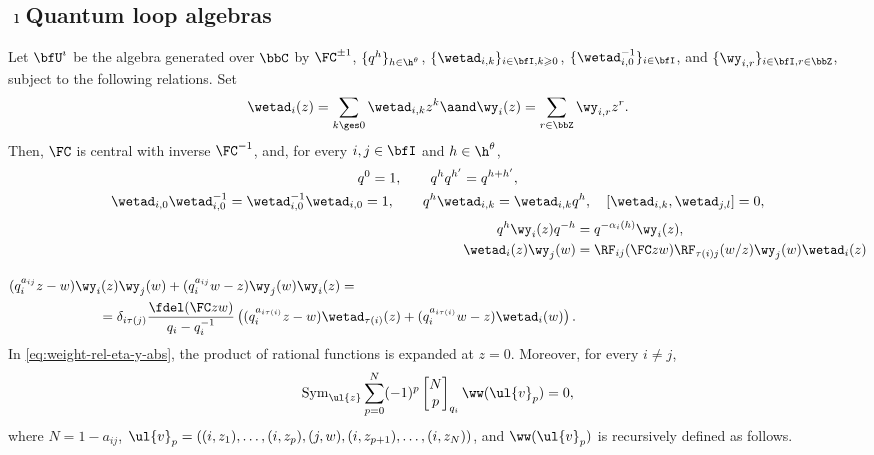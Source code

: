 \documentclass[reqno]{amsart}
\numberwithin{equation}{section}
\begin{document}
\subsection{$\imath$Quantum loop algebras \cite{lu-wang-20, zhang-22,lu-pan-26}}\label{ss:i-quantum-group}
Let $\bfU^\imath$ be the algebra generated over $\bbC$ by $\FC^{\pm1}$, $\{q^h\}_{h\in\h^{\theta}}$, $\{\wetad_{i,k}\}_{i\in\bfI,k\geqslant0}$, $\{\wetad_{i,0}^{-1}\}_{i\in\bfI}$, and $\{\wy_{i,r}\}_{i\in\bfI,r\in\bbZ}$, subject to the following relations. 
Set 
\begin{equation}
	\wetad_{i}(z)=\sum_{k\ges0}\wetad_{i,k}z^k \aand \wy_i(z)=\sum_{r\in\bbZ}\wy_{i,r}z^r.
\end{equation}
Then, $\FC$ is central with inverse $\FC^{-1}$, and, for every $i,j\in\bfI$ and $h\in\h^{\theta}$,
\begin{gather}
\label{eq:cartan-abs}
q^0=1,
\qquad
q^hq^{h'}=q^{h+h'},\\
\label{eq:eta-h-abs}
\wetad_{i,0}\wetad_{i,0}^{-1}=\wetad_{i,0}^{-1}\wetad_{i,0}=1, \qquad
q^h\wetad_{i,k}=\wetad_{i,k}q^h,
\quad
[\wetad_{i,k},\wetad_{j,l}]=0,
\end{gather}
\begin{align}
\label{eq:weight-abs}
q^h \wy_{i}(z)q^{-h}&=q^{-\alpha_i(h)}\wy_{i}(z),\\
\label{eq:weight-rel-eta-y-abs}
\wetad_i(z)\wy_j(w)&=\RF_{ij}(\FC zw)\RF_{\tau(i)j}(w/z)\wy_j(w)\wetad_i(z)\\[1em]
\label{eq:quadratic-y-y-abs}
\begin{split}
(q_i^{a_{ij}}z-w)\wy_i(z)\wy_{j}(w)&+(q_i^{a_{ij}}w-z)\wy_{j}(w)\wy_i(z)=\\
&\hspace{-1.75cm}=\delta_{i\tau(j)}\frac{\fdel(\FC zw)}{q_i-q_i^{-1}}\left((q_i^{a_{i\tau(i)}}z-w)\wetad_{\tau(i)}(z)
+(q_i^{a_{i\tau(i)}}w-z)\wetad_{i}(w)\right).
\end{split}
\end{align}
In \eqref{eq:weight-rel-eta-y-abs}, the product of rational functions is expanded at $z=0$.
Moreover, for every $i\neq j$,
\begin{equation}\label{eq:drinfeld-serre-relations-abs}
\operatorname{Sym}_{\ul{z}}
\sum_{p=0}^N(-1)^p
\begin{bmatrix}N\\p\end{bmatrix}_{q_i}\ww(\ul{v}_p)=0,
\end{equation}
where $N=1-a_{ij}$, $\ul{v}_p=((i,z_1),\ldots,(i,z_p),(j,w),
(i,z_{p+1}),\ldots,(i,z_N))$, and $\ww(\ul{v}_p)$ is recursively defined as follows.
\end{document}
